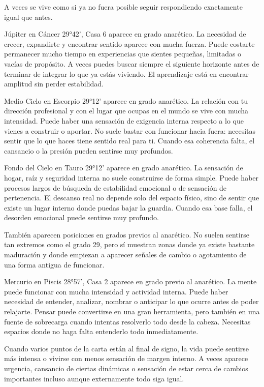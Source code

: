 \documentclass[11pt,a4paper]{article}\usepackage[utf8]{inputenc}
\begin{document}
A veces se vive como si ya no fuera posible seguir respondiendo exactamente igual que antes.

Júpiter en Cáncer 29°42', Casa 6 aparece en grado anarético. La necesidad de crecer, expandirte y encontrar sentido aparece con mucha fuerza. Puede costarte permanecer mucho tiempo en experiencias que sientes pequeñas, limitadas o vacías de propósito. A veces puedes buscar siempre el siguiente horizonte antes de terminar de integrar lo que ya estás viviendo. El aprendizaje está en encontrar amplitud sin perder estabilidad.

Medio Cielo en Escorpio 29°12' aparece en grado anarético. La relación con tu dirección profesional y con el lugar que ocupas en el mundo se vive con mucha intensidad. Puede haber una sensación de exigencia interna respecto a lo que vienes a construir o aportar. No suele bastar con funcionar hacia fuera: necesitas sentir que lo que haces tiene sentido real para ti. Cuando esa coherencia falta, el cansancio o la presión pueden sentirse muy profundos.

Fondo del Cielo en Tauro 29°12' aparece en grado anarético. La sensación de hogar, raíz y seguridad interna no suele construirse de forma simple. Puede haber procesos largos de búsqueda de estabilidad emocional o de sensación de pertenencia. El descanso real no depende solo del espacio físico, sino de sentir que existe un lugar interno donde puedas bajar la guardia. Cuando esa base falla, el desorden emocional puede sentirse muy profundo.

También aparecen posiciones en grados previos al anarético. No suelen sentirse tan extremos como el grado 29, pero sí muestran zonas donde ya existe bastante maduración y donde empiezan a aparecer señales de cambio o agotamiento de una forma antigua de funcionar.

Mercurio en Piscis 28°57', Casa 2 aparece en grado previo al anarético. La mente puede funcionar con mucha intensidad y actividad interna. Puede haber necesidad de entender, analizar, nombrar o anticipar lo que ocurre antes de poder relajarte. Pensar puede convertirse en una gran herramienta, pero también en una fuente de sobrecarga cuando intentas resolverlo todo desde la cabeza. Necesitas espacios donde no haga falta entenderlo todo inmediatamente.

Cuando varios puntos de la carta están al final de signo, la vida puede sentirse más intensa o vivirse con menos sensación de margen interno. A veces aparece urgencia, cansancio de ciertas dinámicas o sensación de estar cerca de cambios importantes incluso aunque externamente todo siga igual.
\end{document}
